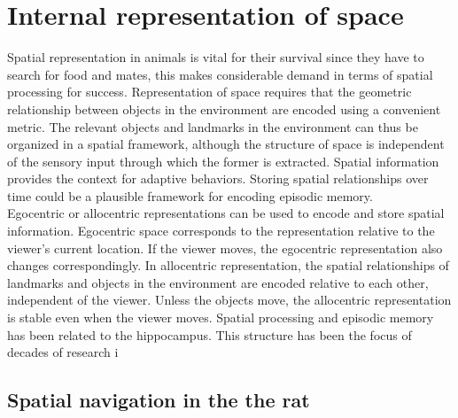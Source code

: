 
\chapter{Internal representation of space} %

\label{space} 


Spatial representation in animals is vital for their survival since they have to search for food and mates, this makes considerable demand in terms of spatial processing for success. Representation of space requires that the geometric relationship between objects in the environment are encoded using a convenient metric. The relevant objects and landmarks in the environment can thus be organized in a spatial framework, although the structure of space is independent of the sensory input through which the former is extracted. Spatial information provides the context for adaptive behaviors. Storing spatial relationships over time could be a plausible framework for encoding episodic memory. \\
Egocentric or allocentric representations can be used to encode and store spatial information. Egocentric space corresponds to the representation relative to the viewer's current location. If the viewer moves, the egocentric representation also changes correspondingly. In allocentric representation, the spatial relationships of landmarks and objects in the environment are encoded relative to each other, independent of the viewer. Unless the objects move, the allocentric representation is stable even when the viewer moves. 
Spatial processing and episodic memory has been related to the hippocampus. This structure has been the focus of decades of research i
\section{Spatial navigation in the the rat}

